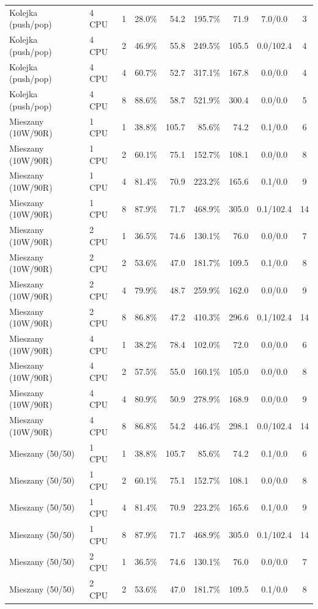 \begin{table}[ht]
{\begin{tabular}{llcrrrrcc}
Kolejka (push/pop) & 4 CPU & 1 & 28.0\% & 54.2 & 195.7\% & 71.9 & 7.0/0.0 & 3 \\
Kolejka (push/pop) & 4 CPU & 2 & 46.9\% & 55.8 & 249.5\% & 105.5 & 0.0/102.4 & 4 \\
Kolejka (push/pop) & 4 CPU & 4 & 60.7\% & 52.7 & 317.1\% & 167.8 & 0.0/0.0 & 4 \\
Kolejka (push/pop) & 4 CPU & 8 & 88.6\% & 58.7 & 521.9\% & 300.4 & 0.0/0.0 & 5 \\
Mieszany (10W/90R) & 1 CPU & 1 & 38.8\% & 105.7 & 85.6\% & 74.2 & 0.1/0.0 & 6 \\
Mieszany (10W/90R) & 1 CPU & 2 & 60.1\% & 75.1 & 152.7\% & 108.1 & 0.0/0.0 & 8 \\
Mieszany (10W/90R) & 1 CPU & 4 & 81.4\% & 70.9 & 223.2\% & 165.6 & 0.1/0.0 & 9 \\
Mieszany (10W/90R) & 1 CPU & 8 & 87.9\% & 71.7 & 468.9\% & 305.0 & 0.1/102.4 & 14 \\
Mieszany (10W/90R) & 2 CPU & 1 & 36.5\% & 74.6 & 130.1\% & 76.0 & 0.0/0.0 & 7 \\
Mieszany (10W/90R) & 2 CPU & 2 & 53.6\% & 47.0 & 181.7\% & 109.5 & 0.1/0.0 & 8 \\
Mieszany (10W/90R) & 2 CPU & 4 & 79.9\% & 48.7 & 259.9\% & 162.0 & 0.0/0.0 & 9 \\
Mieszany (10W/90R) & 2 CPU & 8 & 86.8\% & 47.2 & 410.3\% & 296.6 & 0.1/102.4 & 14 \\
Mieszany (10W/90R) & 4 CPU & 1 & 38.2\% & 78.4 & 102.0\% & 72.0 & 0.0/0.0 & 6 \\
Mieszany (10W/90R) & 4 CPU & 2 & 57.5\% & 55.0 & 160.1\% & 105.0 & 0.0/0.0 & 8 \\
Mieszany (10W/90R) & 4 CPU & 4 & 80.9\% & 50.9 & 278.9\% & 168.9 & 0.0/0.0 & 9 \\
Mieszany (10W/90R) & 4 CPU & 8 & 86.8\% & 54.2 & 446.4\% & 298.1 & 0.0/102.4 & 14 \\
Mieszany (50/50) & 1 CPU & 1 & 38.8\% & 105.7 & 85.6\% & 74.2 & 0.1/0.0 & 6 \\
Mieszany (50/50) & 1 CPU & 2 & 60.1\% & 75.1 & 152.7\% & 108.1 & 0.0/0.0 & 8 \\
Mieszany (50/50) & 1 CPU & 4 & 81.4\% & 70.9 & 223.2\% & 165.6 & 0.1/0.0 & 9 \\
Mieszany (50/50) & 1 CPU & 8 & 87.9\% & 71.7 & 468.9\% & 305.0 & 0.1/102.4 & 14 \\
Mieszany (50/50) & 2 CPU & 1 & 36.5\% & 74.6 & 130.1\% & 76.0 & 0.0/0.0 & 7 \\
Mieszany (50/50) & 2 CPU & 2 & 53.6\% & 47.0 & 181.7\% & 109.5 & 0.1/0.0 & 8 \\

\end{tabular}}
\end{table}
